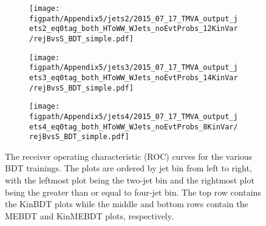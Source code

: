 \begin{figure}[!hbt]
    \begin{subfigure}[t]{0.316\textwidth}
        \texttt{[image: \\figpath/Appendix5/jets2/2015\_07\_17\_TMVA\_output\_jets2\_eq0tag\_both\_HToWW\_WJets\_noEvtProbs\_12KinVar/rejBvsS\_BDT\_simple.pdf]}
        \caption{}
        \label{fig:KinMEBDT_ROC_jets2}
    \end{subfigure}
    \begin{subfigure}[t]{0.316\textwidth}
        \texttt{[image: \\figpath/Appendix5/jets3/2015\_07\_17\_TMVA\_output\_jets3\_eq0tag\_both\_HToWW\_WJets\_noEvtProbs\_14KinVar/rejBvsS\_BDT\_simple.pdf]}
        \caption{}
        \label{fig:KinMEBDT_ROC_jets3}
    \end{subfigure}
    \begin{subfigure}[t]{0.316\textwidth}
        \texttt{[image: \\figpath/Appendix5/jets4/2015\_07\_17\_TMVA\_output\_jets4\_eq0tag\_both\_HToWW\_WJets\_noEvtProbs\_8KinVar/rejBvsS\_BDT\_simple.pdf]}
        \caption{}
        \label{fig:KinMEBDT_ROC_jets4}
    \end{subfigure}
    \caption{The receiver operating characteristic (ROC) curves for the various BDT trainings. The plots are ordered by jet bin from left to right, with the leftmost plot being the two-jet bin and the rightmost plot being the greater than or equal to four-jet bin. The top row contains the KinBDT plots while the middle and bottom rows contain the MEBDT and KinMEBDT plots, respectively.}
    \label{fig:BDT_ROC_all}
\end{figure}




\clearpage
